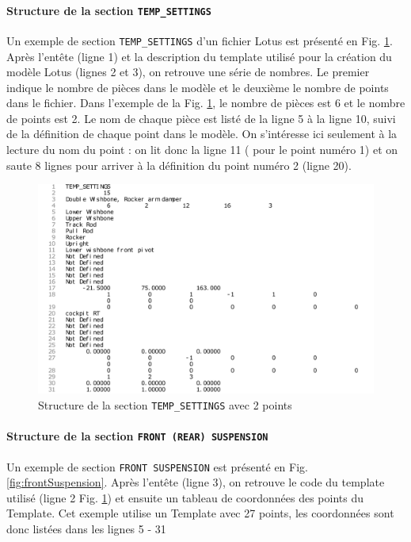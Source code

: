 \paragraph{Structure de la section \texttt{TEMP\_SETTINGS}} %

\par Un exemple de section \texttt{TEMP\_SETTINGS} d'un fichier Lotus est présenté en Fig. \ref{fig:temp_settings}. Après l'entête (ligne 1) et la description du template utilisé pour la création du modèle Lotus (lignes 2 et 3), on retrouve une série de nombres. Le premier indique le nombre de pièces dans le modèle et le deuxième le nombre de points dans le fichier. Dans l'exemple de la Fig. \ref{fig:temp_settings}, le nombre de pièces est 6 et le nombre de points est 2. Le nom de chaque pièce est listé de la ligne 5 à la ligne 10, suivi de la définition de chaque point dans le modèle. On s'intéresse ici seulement à la lecture du nom du point : on lit donc la ligne 11 ( pour le point numéro 1) et on saute 8 lignes pour arriver à la définition du point numéro 2 (ligne 20).

\begin{figure}
    \centering
    \includegraphics[width=\linewidth]{fichiers/temp_settings.pdf}
    \caption{Structure de la section \texttt{TEMP\_SETTINGS} avec 2 points}
    \label{fig:temp_settings}
\end{figure}


\paragraph{Structure de la section \texttt{FRONT (REAR) SUSPENSION}} %

\par Un exemple de section \texttt{FRONT SUSPENSION} est présenté en Fig. \ref{fig:frontSuspension}. Après l'entête (ligne 3), on retrouve le code du template utilisé (ligne 2 Fig. \ref{fig:temp_settings}) et ensuite un tableau de coordonnées des points du Template. Cet exemple utilise un Template avec 27 points, les coordonnées sont donc listées dans les lignes 5 - 31

